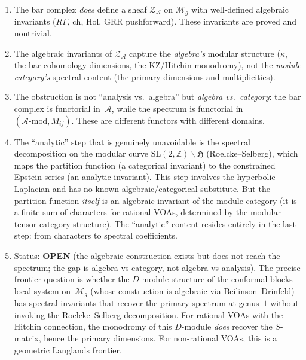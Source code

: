 \documentclass[11pt]{article}
\newcommand{\cA}{\mathcal{A}}
\newcommand{\cM}{\mathcal{M}}
\newcommand{\cZ}{\mathcal{Z}}
\newcommand{\Z}{\mathbb{Z}}
\begin{document}
\begin{enumerate}[label=(\alph*)]
\item The bar complex \emph{does} define a sheaf
  $\cZ_\cA$ on $\overline{\cM}_g$ with well-defined algebraic
  invariants ($R\Gamma$, $\mathrm{ch}$, $\mathrm{Hol}$,
  GRR pushforward).  These invariants are proved and nontrivial.

\item The algebraic invariants of $\cZ_\cA$ capture
  the \emph{algebra's} modular structure ($\kappa$, the bar
  cohomology dimensions, the KZ/Hitchin monodromy), not
  the \emph{module category's} spectral content (the primary
  dimensions and multiplicities).

\item The obstruction is not ``analysis vs.\ algebra''
  but \emph{algebra vs.\ category}: the bar complex is
  functorial in~$\cA$, while the spectrum is functorial in
  $(\cA\text{-}\mathrm{mod}, M_{ij})$.  These are different
  functors with different domains.

\item The ``analytic'' step that is genuinely unavoidable
  is the spectral decomposition on the modular curve
  $\mathrm{SL}(2,\Z)\backslash\mathfrak{H}$
  (Roelcke--Selberg), which maps the partition function
  (a categorical invariant) to the constrained Epstein
  series (an analytic invariant).  This step involves the
  hyperbolic Laplacian and has no known algebraic/categorical
  substitute.  But the partition function
  \emph{itself} is an algebraic invariant of the module
  category (it is a finite sum of characters for rational VOAs,
  determined by the modular tensor category structure).
  The ``analytic'' content resides entirely in the last step:
  from characters to spectral coefficients.

\item Status: \textbf{OPEN} (the algebraic construction
  exists but does not reach the spectrum; the gap is
  algebra-vs-category, not algebra-vs-analysis).
  The precise frontier question is whether the $D$-module
  structure of the conformal blocks local system on~$\cM_g$
  (whose construction is algebraic via Beilinson--Drinfeld)
  has spectral invariants that recover the primary spectrum
  at genus~$1$ without invoking the Roelcke--Selberg
  decomposition.  For rational VOAs with the Hitchin
  connection, the monodromy of this $D$-module \emph{does}
  recover the $S$-matrix, hence the primary dimensions.
  For non-rational VOAs, this is a geometric Langlands
  frontier.
\end{enumerate}
\end{document}
